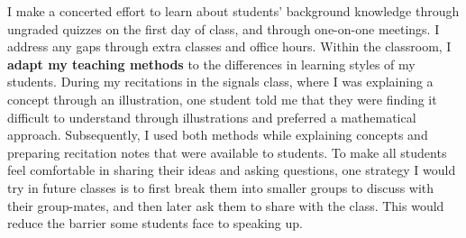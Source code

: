 \documentclass[10pt]{article}
\begin{document}
I make a concerted effort to learn about students' background knowledge through ungraded quizzes on the first day of class, and through one-on-one meetings. I address any gaps through extra classes and office hours. 
Within the  classroom, I \textbf{adapt my teaching methods} to the differences in learning styles of my students. %
During my recitations in the signals class, where I was explaining a concept through an illustration, one student told me that they were finding it difficult to understand through illustrations and preferred a mathematical approach. Subsequently, I used both methods while explaining concepts and preparing recitation notes that were available to students. %
To make all students feel comfortable in sharing their ideas and asking questions, one strategy I would try in future classes is to first break them into smaller groups to discuss with their group-mates, and then later ask them to share with the class. This would reduce the barrier some students face to speaking up. %



\end{document}
